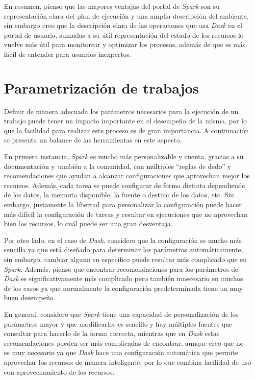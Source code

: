 En resumen, pienso que las mayores ventajas del portal de \textit{Spark} son su representación clara del plan de ejecución y una amplia descripción del ambiente, sin embargo creo que la descripción clara de las operaciones que usa \textit{Dask} en el portal de usuario, sumadas a su útil representación del estado de los recursos lo vuelve más útil para monitorear y optimizar los procesos, además de que es más fácil de entender para usuarios inexpertos.


\section{Parametrización de trabajos}

Definir de manera adecuada los parámetros necesarios para la ejecución de un trabajo puede tener un impacto importante en el desempeño de la misma, por lo que la facilidad para realizar este proceso es de gran importancia. A continuación se presenta un balance de las herramientas en este aspecto.

En primera instancia, \textit{Spark} es mucho más personalizable y cuenta, gracias a su documentación y también a la comunidad, con múltiples ``reglas de dedo'' y recomendaciones que ayudan a alcanzar configuraciones que aprovechan mejor los recursos. Además, cada tarea se puede configurar de forma distinta dependiendo de los datos, la memoria disponible, la fuente o destino de los datos, etc. Sin embargo, justamente la libertad para personalizar la configuración puede hacer más difícil la configuración de tareas y resultar en ejecuciones que no aprovechan bien los recursos, lo cuál puede ser una gran desventaja.

Por otro lado, en el caso de \textit{Dask}, considero que la configuración es mucho más sencilla ya que está diseñado para determinar los parámetros automáticamente, sin embargo, cambiar alguno en específico puede resultar más complicado que en \textit{Spark}. Además, pienso que encontrar recomendaciones para los parámetros de \textit{Dask} es significativamente más complicado pero también innecesario en muchos de los casos ya que normalmente la configuración predeterminada tiene un muy buen desempeño.

En general, considero que \textit{Spark} tiene una capacidad de personalización de los parámetros mayor y que modificarlos es sencillo y hay múltiples fuentes que consultar para hacerlo de la forma correcta, mientras que en \textit{Dask} estas recomendaciones pueden ser más complicadas de encontrar, aunque creo que no es muy necesario ya que \textit{Dask} hace una configuración automática que permite aprovechar los recursos de manera inteligente, por lo que combina facilidad de uso con aprovechamiento de los recursos.

